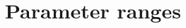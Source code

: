 \documentclass{article}
\begin{document}
\newpage
\section{Parameter ranges} 	\label{sec:pars}




\newpage











\end{document}
